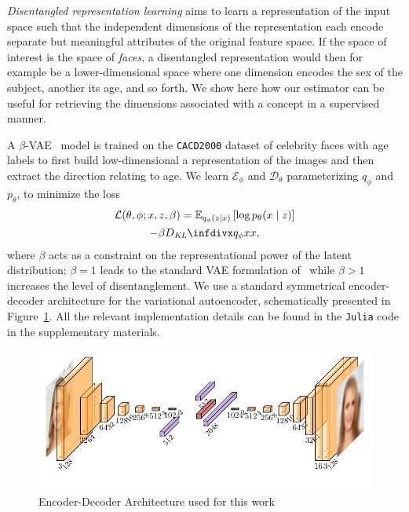 \emph{Disentangled representation learning} aims to learn a representation of the input space such that the independent dimensions of the representation each encode separate but meaningful attributes of the original feature space.
If the space of interest is the space of \emph{faces}, a disentangled representation would then for example be a lower-dimensional space where one dimension encodes the sex of the subject, another its age, and so forth. 
We show here how our estimator can be useful for retrieving the dimensions associated with a concept in a supervised manner.

A $\beta$-VAE~\citep{higginsBetaVAELearningBasic2017} model is trained on the \texttt{CACD2000} dataset of celebrity faces with age labels to first build low-dimensional a representation of the images and then extract the direction relating to age. We learn $\mathcal{E}_{\phi}$ and $\mathcal{D}_{\theta}$ parameterizing $q_\phi$ and $p_\theta$, to minimize the loss
\begin{multline}
    \mathcal{L} (\theta, \phi; x, z, \beta) = \mathbb{E}_{q_\phi (z \mid x)} \left[ \log p_\theta (x \mid z) \right] \\
    - \beta \infdiv{q_\phi x}{x},
\end{multline}
where $\beta$ acts as a constraint on the representational power of the latent distribution; $\beta = 1$ leads to the standard VAE formulation of~\cite{kingmaAutoEncodingVariationalBayes2014} while $\beta > 1$ increases the level of disentanglement. We use a standard symmetrical encoder-decoder architecture for the variational autoencoder, schematically presented in Figure~\ref{fig:vae}. All the relevant implementation details can be found in the \texttt{Julia} code in the supplementary materials.
\begin{figure}
    \centering
    \includegraphics[width=\textwidth]{figs/vae.pdf}
    \caption{Encoder-Decoder Architecture used for this work}\label{fig:vae}
\end{figure}
